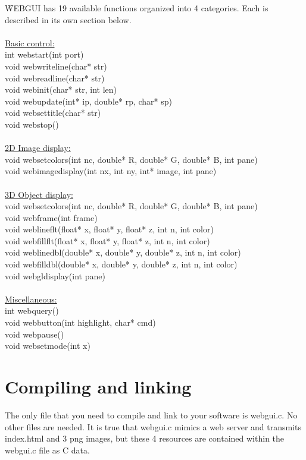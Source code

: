 \f{WEBGUI} has 19 available functions organized into 4 categories. Each is described in its own section below.\\
\\
\underline{Basic control:}\\
int webstart(int port)\\
void webwriteline(char* str)\\
void webreadline(char* str)\\
void webinit(char* str, int len)\\
void webupdate(int* ip, double* rp, char* sp)\\
void websettitle(char* str)\\
void webstop()\\
\\
\underline{2D Image display:}\\
void websetcolors(int nc, double* R, double* G, double* B, int pane)\\
void webimagedisplay(int nx, int ny, int* image, int pane)\\
\\
\underline{3D Object display:}\\
void websetcolors(int nc, double* R, double* G, double* B, int pane)\\
void webframe(int frame)\\
void weblineflt(float* x, float* y, float* z, int n, int color)\\
void webfillflt(float* x, float* y, float* z, int n, int color)\\
void weblinedbl(double* x, double* y, double* z, int n, int color)\\
void webfilldbl(double* x, double* y, double* z, int n, int color)\\
void webgldisplay(int pane)\\
\\
\underline{Miscellaneous:}\\
int webquery()\\
void webbutton(int highlight, char* cmd)\\
void webpause()\\
void websetmode(int x)\\

\section{Compiling and linking}
The only file that you need to compile and link to your software is webgui.c. No other files are needed. It is true that webgui.c 
mimics a web server and transmits index.html and 3 png images, but these 4 resources are contained within the webgui.c
file as C data.

